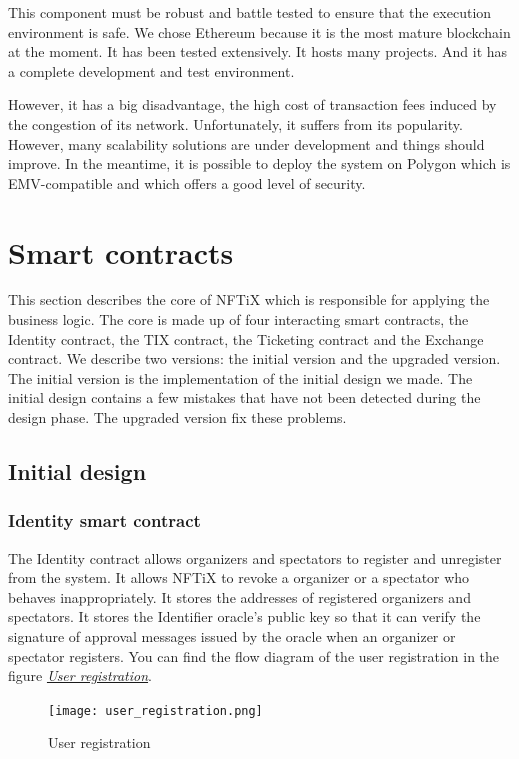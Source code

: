 \documentclass[a4paper,11pt,oneside]{report}
\begin{document}
This component must be robust and battle tested to ensure that the execution environment is safe. We chose Ethereum because it is the most mature blockchain at the moment. It has been tested extensively. It hosts many projects. And it has a complete development and test environment.

However, it has a big disadvantage, the high cost of transaction fees induced by the congestion of its network. Unfortunately, it suffers from its popularity. However, many scalability solutions are under development and things should improve. In the meantime, it is possible to deploy the system on Polygon which is EMV-compatible and which offers a good level of security.

\section{Smart contracts}
This section describes the core of NFTiX which is responsible for applying the business logic. The core is made up of four interacting smart contracts, the Identity contract, the TIX contract, the Ticketing contract and the Exchange contract. We describe two versions: the initial version and the upgraded version. The initial version is the implementation of the initial design we made. The initial design contains a few mistakes that have not been detected during the design phase. The upgraded version fix these problems.

\subsection{Initial design}

\subsubsection{Identity smart contract}
The Identity contract allows organizers and spectators to register and unregister from the system. It allows NFTiX to revoke a organizer or a spectator who behaves inappropriately. It stores the addresses of registered organizers and spectators. It stores the Identifier oracle's public key so that it can verify the signature of approval messages issued by the oracle when an organizer or spectator registers. You can find the flow diagram of the user registration in the figure  \hyperref[fig:user_registration]{ \textit{User registration}}.

\begin{figure}[h!]
  \texttt{[image: user\_registration.png]}
  \caption{User registration}
  \label{fig:user_registration}
\end{figure}
\end{document}

